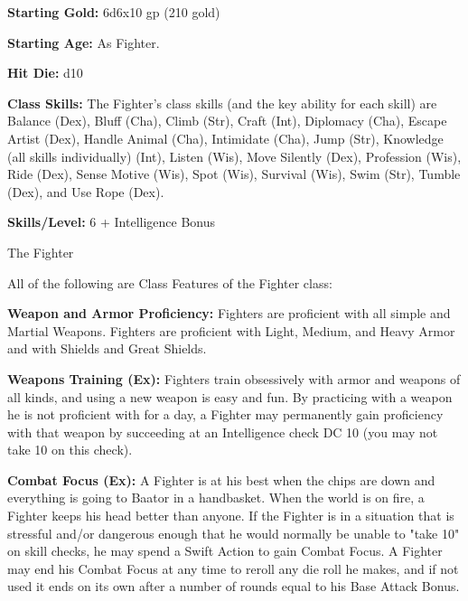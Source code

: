 \textbf{Starting Gold:} 6d6x10 gp (210 gold)

\textbf{Starting Age:} As Fighter.

\textbf{Hit Die:} d10

\textbf{Class Skills:} The Fighter's class skills (and the key ability for each skill) are Balance (Dex), Bluff (Cha), Climb (Str), Craft (Int), Diplomacy (Cha), Escape Artist (Dex), Handle Animal (Cha), Intimidate (Cha), Jump (Str), Knowledge (all skills individually) (Int), Listen (Wis), Move Silently (Dex), Profession (Wis), Ride (Dex), Sense Motive (Wis), Spot (Wis), Survival (Wis), Swim (Str), Tumble (Dex), and Use Rope (Dex).

\textbf{Skills/Level:} 6 + Intelligence Bonus

\goodbab{}
\goodfor{}
\goodref{}
\goodwil{}

\begin{classtable}{The Fighter}
\end{classtable}

\ClassFeatures
All of the following are Class Features of the Fighter class:

\textbf{Weapon and Armor Proficiency:} Fighters are proficient with all simple and Martial Weapons. Fighters are proficient with Light, Medium, and Heavy Armor and with Shields and Great Shields.

\textbf{Weapons Training (Ex):} Fighters train obsessively with armor and weapons of all kinds, and using a new weapon is easy and fun. By practicing with a weapon he is not proficient with for a day, a Fighter may permanently gain proficiency with that weapon by succeeding at an Intelligence check DC 10 (you may not take 10 on this check).

\textbf{Combat Focus (Ex):} A Fighter is at his best when the chips are down and everything is going to Baator in a handbasket. When the world is on fire, a Fighter keeps his head better than anyone. If the Fighter is in a situation that is stressful and/or dangerous enough that he would normally be unable to "take 10" on skill checks, he may spend a Swift Action to gain Combat Focus. A Fighter may end his Combat Focus at any time to reroll any die roll he makes, and if not used it ends on its own after a number of rounds equal to his Base Attack Bonus.

